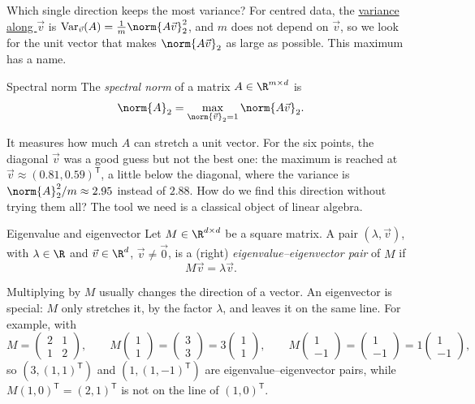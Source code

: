 \documentclass[a4paper,12pt,oneside]{report}
\begin{document}
Which single direction keeps the most variance? For centred data, the
\hyperref[def:variance-direction]{variance along $\vec v$} is
$\mathrm{Var}_{\vec v}(A)=\frac1m\norm{A\vec v}_2^2$, and $m$ does not
depend on $\vec v$, so we look for the unit vector that makes
$\norm{A\vec v}_2$ as large as possible. This maximum has a name.

\begin{frameddefn}{Spectral norm}
\label{def:spectral-norm}
The \emph{spectral norm} of a matrix $A\in\R^{m\times d}$ is
\[
  \norm{A}_2=\max_{\norm{\vec v}_2=1}\norm{A\vec v}_2 .
\]
\end{frameddefn}

It measures how much $A$ can stretch a unit vector.
\label{par:best-direction-six}For the six
points, the diagonal $\vec v$ was a good guess but not the best one:
the maximum is reached at $\vec v\approx(0.81,0.59)^{\mathsf T}$, a
little below the diagonal, where the variance is
$\norm{A}_2^2/m\approx2.95$ instead of $2.88$. How do we find this
direction without trying them all? The tool we need is a classical
object of linear algebra.

\begin{frameddefn}{Eigenvalue and eigenvector}
\label{def:eigenvector}
Let $M\in\R^{d\times d}$ be a square matrix. A pair $(\lambda,\vec v)$,
with $\lambda\in\R$ and $\vec v\in\R^d$, $\vec v\neq\vec 0$, is a
(right) \emph{eigenvalue--eigenvector pair} of $M$ if
\[
  M\vec v=\lambda\vec v .
\]
\end{frameddefn}

Multiplying by $M$ usually changes the direction of a vector. An
eigenvector is special: $M$ only stretches it, by the factor
$\lambda$, and leaves it on the same line. For example, with
\[
  M=\begin{pmatrix}2&1\\1&2\end{pmatrix},\qquad
  M\begin{pmatrix}1\\1\end{pmatrix}=\begin{pmatrix}3\\3\end{pmatrix}
    =3\begin{pmatrix}1\\1\end{pmatrix},\qquad
  M\begin{pmatrix}1\\-1\end{pmatrix}=\begin{pmatrix}1\\-1\end{pmatrix}
    =1\begin{pmatrix}1\\-1\end{pmatrix},
\]
so $(3,(1,1)^{\mathsf T})$ and $(1,(1,-1)^{\mathsf T})$ are
eigenvalue--eigenvector pairs, while
$M(1,0)^{\mathsf T}=(2,1)^{\mathsf T}$ is not on the line of
$(1,0)^{\mathsf T}$.
\end{document}
